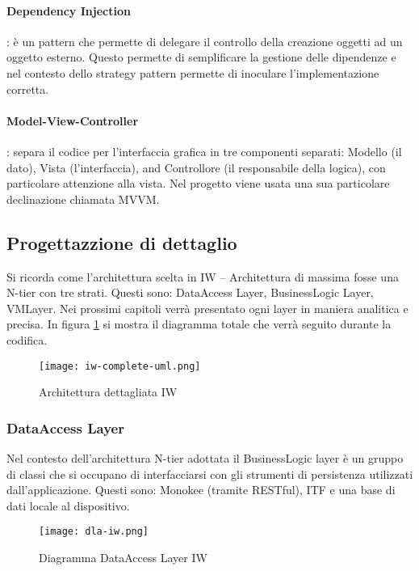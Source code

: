 \paragraph{Dependency Injection}: è un pattern che permette di delegare il controllo della creazione oggetti ad un oggetto esterno. Questo permette di semplificare la gestione delle dipendenze e nel contesto dello strategy pattern permette di inoculare l’implementazione corretta.

\paragraph{Model-View-Controller}: separa il codice per l’interfaccia grafica in tre componenti separati: Modello (il dato), Vista (l’interfaccia), and Controllore (il responsabile della logica), con particolare attenzione alla vista. Nel progetto viene usata una sua particolare declinazione chiamata MVVM. 

\subsection{Progettazzione di dettaglio}
Si ricorda come l’architettura scelta in IW – Architettura di massima fosse una N-tier con tre strati. Questi sono: DataAccess Layer, BusinessLogic Layer, VMLayer. Nei prossimi capitoli verrà presentato ogni layer in maniera analitica e precisa. In figura \ref{fig:ark-dett-iw} si mostra il diagramma totale che verrà seguito durante la codifica.

\begin{figure}[htbp]
    \centering
    \texttt{[image: iw-complete-uml.png]} 
    \caption{Architettura dettagliata IW}
    \label{fig:ark-dett-iw} 
\end{figure}
\subsubsection{DataAccess Layer}
Nel contesto dell’architettura N-tier adottata il BusinessLogic layer è un gruppo di classi che si occupano di interfacciarsi con gli strumenti di persistenza utilizzati dall’applicazione. Questi sono: Monokee (tramite RESTful), ITF e una base di dati locale al dispositivo. 
\begin{figure}[htbp]
    \centering
    \texttt{[image: dla-iw.png]} 
    \caption{Diagramma DataAccess Layer IW}
    \label{fig:dla-iw} 
\end{figure}
